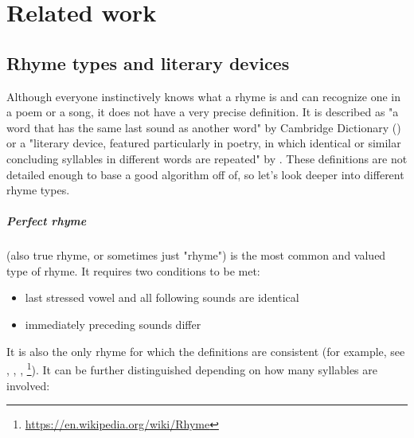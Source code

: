 \chapter{Related work}


\section{Rhyme types and literary devices}
Although everyone instinctively knows what a rhyme is and can recognize one in a poem or a song, it does not have a very precise definition. It is described as "a word that has the same last sound as another word" by Cambridge Dictionary (\cite{walter2008cambridge}) or a "literary device, featured particularly in poetry, in which identical or similar concluding syllables in different words are repeated" by \cite{literarydevices2020}. These definitions are not detailed enough to base a good algorithm off of, so let's look deeper into different rhyme types.

\paragraph{Perfect rhyme} (also true rhyme, or sometimes just "rhyme") is the most common and valued  type of rhyme. It requires two conditions to be met:

\begin{itemize}
	\item last stressed vowel and all following sounds are identical
	\item immediately preceding sounds differ
\end{itemize}

It is also the only rhyme for which the definitions are consistent (for example, see \cite{bain1867manual}, \cite{vanphonological}, \cite{bergman2017litcharts}, \footnote{\url{https://en.wikipedia.org/wiki/Rhyme}}). It can be further distinguished depending on how many syllables are involved:

